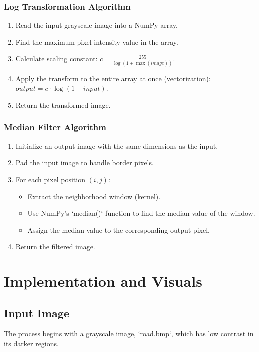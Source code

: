 \documentclass[12pt,a4paper]{article}
\begin{document}
\subsubsection{Log Transformation Algorithm}
\begin{enumerate}
    \item Read the input grayscale image into a NumPy array.
    \item Find the maximum pixel intensity value in the array.
    \item Calculate scaling constant: $c = \frac{255}{\log(1 + \max(image))}$.
    \item Apply the transform to the entire array at once (vectorization): $output = c \cdot \log(1 + input)$.
    \item Return the transformed image.
\end{enumerate}

\subsubsection{Median Filter Algorithm}
\begin{enumerate}
    \item Initialize an output image with the same dimensions as the input.
    \item Pad the input image to handle border pixels.
    \item For each pixel position $(i,j)$:
    \begin{itemize}
        \item Extract the neighborhood window (kernel).
        \item Use NumPy's `median()` function to find the median value of the window.
        \item Assign the median value to the corresponding output pixel.
    \end{itemize}
    \item Return the filtered image.
\end{enumerate}

\section{Implementation and Visuals}

\subsection{Input Image}
The process begins with a grayscale image, `road.bmp`, which has low contrast in its darker regions.
\end{document}
